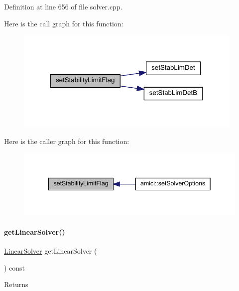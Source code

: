 Definition at line 656 of file solver.\+cpp.

Here is the call graph for this function\+:
\nopagebreak
\begin{figure}[H]
\begin{center}
\leavevmode
\includegraphics[width=309pt]{classamici_1_1_solver_afdf072c35ae67261f8106e8bf6b4a44a_cgraph}
\end{center}
\end{figure}
Here is the caller graph for this function\+:
\nopagebreak
\begin{figure}[H]
\begin{center}
\leavevmode
\includegraphics[width=342pt]{classamici_1_1_solver_afdf072c35ae67261f8106e8bf6b4a44a_icgraph}
\end{center}
\end{figure}
\mbox{\label{classamici_1_1_solver_aa5cde2d316aae1d60d6eaf94ce7a854f}} 
\paragraph{\texorpdfstring{get\+Linear\+Solver()}{getLinearSolver()}}
{\footnotesize\ttfamily \mbox{\hyperlink{namespaceamici_a1a6a4776314a0843143e5631c3ce21a7}{Linear\+Solver}} get\+Linear\+Solver (\begin{DoxyParamCaption}{ }\end{DoxyParamCaption}) const}

\begin{DoxyReturn}{Returns}

\end{DoxyReturn}


